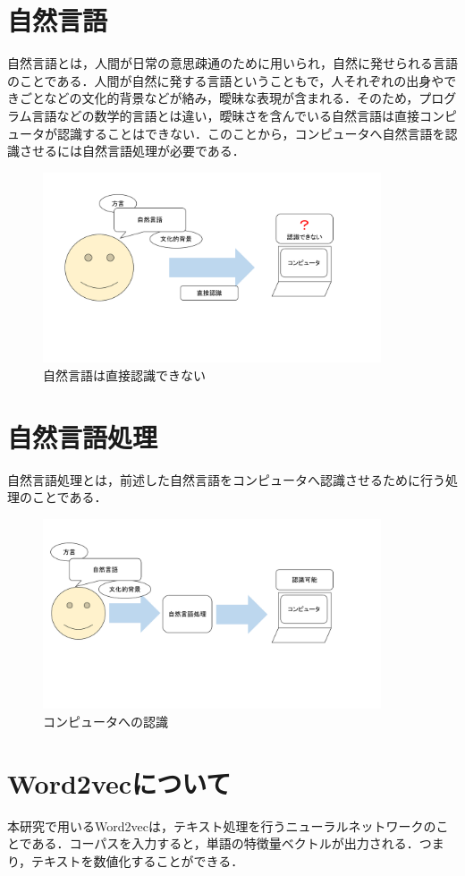 \section{自然言語}
自然言語とは，人間が日常の意思疎通のために用いられ，自然に発せられる言語のことである．人間が自然に発する言語ということもで，人それぞれの出身やできごとなどの文化的背景などが絡み，曖昧な表現が含まれる．そのため，プログラム言語などの数学的言語とは違い，曖昧さを含んでいる自然言語は直接コンピュータが認識することはできない．このことから，コンピュータへ自然言語を認識させるには自然言語処理が必要である．
\begin{figure}[htb]
\centering
\includegraphics[width=10cm]{2-1.pdf}
\caption{自然言語は直接認識できない}\label{2-1}
\end{figure}
\newpage

\section{自然言語処理}
自然言語処理とは，前述した自然言語をコンピュータへ認識させるために行う処理のことである．
\begin{figure}[htb]
\centering
\includegraphics[width=10cm]{2-2.pdf}
\caption{コンピュータへの認識}\label{2-2}
\end{figure}
\newpage

\section{Word2vecについて}
本研究で用いるWord2vecは，テキスト処理を行うニューラルネットワークのことである．コーパスを入力すると，単語の特徴量ベクトルが出力される．つまり，テキストを数値化することができる．

